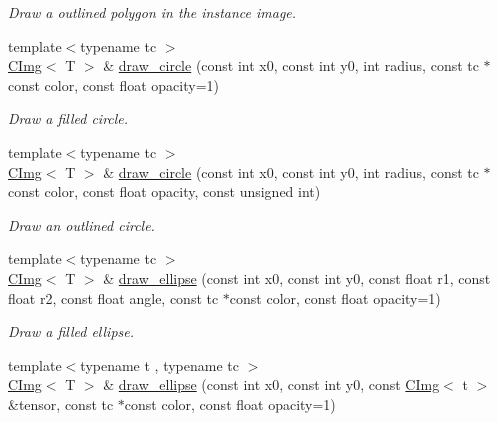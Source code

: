 \begin{DoxyCompactItemize}
\begin{DoxyCompactList}\small\item\em Draw a outlined polygon in the instance image. \item\end{DoxyCompactList}\item 
{\footnotesize template$<$typename tc $>$ }\\\hyperlink{structcimg__library_1_1CImg}{CImg}$<$ T $>$ \& \hyperlink{structcimg__library_1_1CImg_a0fcdceae39ad1bfa32dabc70ab503455}{draw\_\-circle} (const int x0, const int y0, int radius, const tc $\ast$const color, const float opacity=1)
\begin{DoxyCompactList}\small\item\em Draw a filled circle. \item\end{DoxyCompactList}\item 
{\footnotesize template$<$typename tc $>$ }\\\hyperlink{structcimg__library_1_1CImg}{CImg}$<$ T $>$ \& \hyperlink{structcimg__library_1_1CImg_abc6077a1255326a211f32716fcc416fc}{draw\_\-circle} (const int x0, const int y0, int radius, const tc $\ast$const color, const float opacity, const unsigned int)
\begin{DoxyCompactList}\small\item\em Draw an outlined circle. \item\end{DoxyCompactList}\item 
{\footnotesize template$<$typename tc $>$ }\\\hyperlink{structcimg__library_1_1CImg}{CImg}$<$ T $>$ \& \hyperlink{structcimg__library_1_1CImg_a781e0aaf137cb5783dcc4602fd87fdbc}{draw\_\-ellipse} (const int x0, const int y0, const float r1, const float r2, const float angle, const tc $\ast$const color, const float opacity=1)
\begin{DoxyCompactList}\small\item\em Draw a filled ellipse. \item\end{DoxyCompactList}\item 
{\footnotesize template$<$typename t , typename tc $>$ }\\\hyperlink{structcimg__library_1_1CImg}{CImg}$<$ T $>$ \& \hyperlink{structcimg__library_1_1CImg_aaee5c65bcb8d1aa53500dd93b70dc206}{draw\_\-ellipse} (const int x0, const int y0, const \hyperlink{structcimg__library_1_1CImg}{CImg}$<$ t $>$ \&tensor, const tc $\ast$const color, const float opacity=1)

\end{DoxyCompactItemize}

